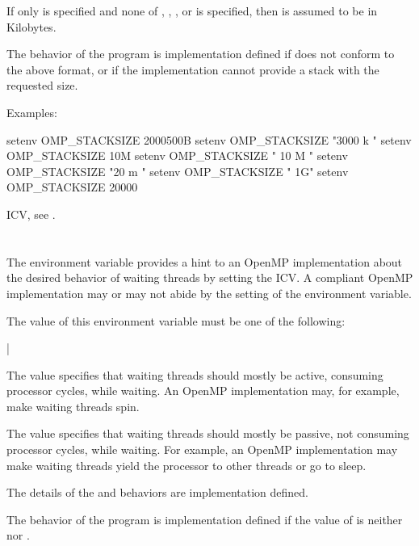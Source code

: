 If only  is specified and none of , , , 
or  is specified, then  is assumed to be in Kilobytes.

The behavior of the program is implementation defined if  
does not conform to the above format, or if the implementation cannot provide 
a stack with the requested size.

Examples:
\begin{ompEnv}
setenv OMP_STACKSIZE 2000500B
setenv OMP_STACKSIZE "3000 k "
setenv OMP_STACKSIZE 10M
setenv OMP_STACKSIZE " 10 M "
setenv OMP_STACKSIZE "20 m "
setenv OMP_STACKSIZE " 1G"
setenv OMP_STACKSIZE 20000
\end{ompEnv}

\begin{crossrefs}
\item {} ICV, see .
\end{crossrefs}



\section{}
\label{sec:OMP_WAIT_POLICY}
The  environment variable provides a hint to an OpenMP
implementation about the desired behavior of waiting threads by setting the
 ICV. A compliant OpenMP implementation may or may not 
abide by the setting of the environment variable.

The value of this environment variable must be one of the following:

{|}

The  value specifies that waiting threads should mostly be 
active, consuming processor cycles, while waiting. An OpenMP implementation 
may, for example, make waiting threads spin.

The  value specifies that waiting threads should mostly be 
passive, not consuming processor cycles, while waiting. For example, an 
OpenMP implementation may make waiting threads yield the processor to 
other threads or go to sleep.

The details of the  and  behaviors are 
implementation defined.

The behavior of the program is implementation defined if the value of
 is neither  nor .

